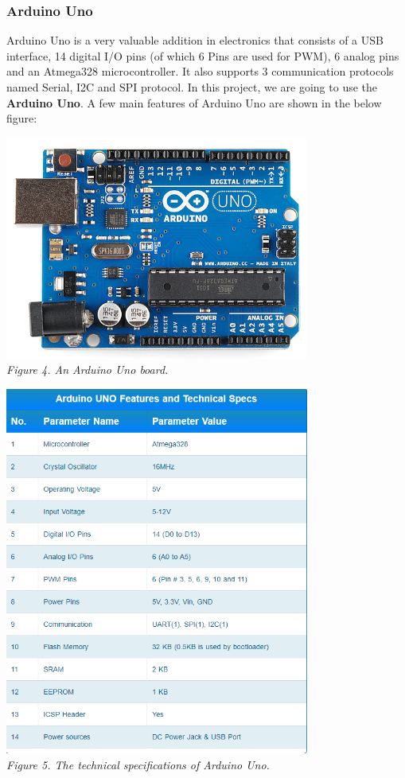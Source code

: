 \documentclass[a4paper]{article}
\begin{document}
\subsubsection{Arduino Uno}
Arduino Uno is a very valuable addition in electronics that consists of a USB interface, 14 digital I/O pins (of which 6 Pins are used for PWM), 6 analog pins and an Atmega328 microcontroller. It also supports 3 communication protocols named Serial, I2C and SPI protocol. In this project, we are going to use the \textbf{Arduino Uno}. A few main features of Arduino Uno are shown in the below figure:
\medskip
\begin{center}
    \includegraphics[width=10cm]{pictures/4.png}\\
    \textit{Figure 4. An Arduino Uno board.}\\
\end{center}
\medskip
\begin{center}
    \includegraphics[width=10cm]{pictures/5.png}\\
    \textit{Figure 5. The technical specifications of Arduino Uno.}\\
\end{center}
\medskip
\end{document}

